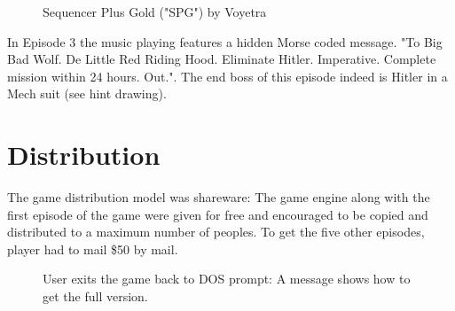 \documentclass[book.tex]{subfiles}
\begin{document}
\begin{figure}[H]
\centering
\caption{Sequencer Plus Gold ("SPG") by Voyetra}
\end{figure}



 In Episode 3 the music playing features a hidden Morse coded message. "To Big Bad Wolf. De Little Red Riding Hood. Eliminate Hitler. Imperative. Complete mission within 24 hours. Out.". The end boss of this episode indeed is Hitler in a Mech suit (see hint drawing).




























\section{Distribution}
The game distribution model was shareware: The game engine along with the first episode of the game were given for free and encouraged to be copied and distributed to a maximum number of peoples. To get the five other episodes, player had to mail \$50 by mail.\\
\par
\begin{figure}[H]
\centering
 \caption{User exits the game back to DOS prompt: A message shows how to get the full version.}
 \end{figure}
\end{document}
